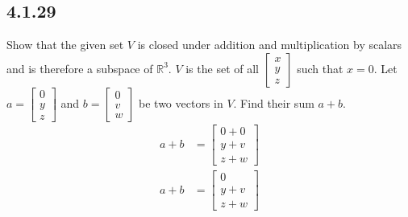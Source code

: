\documentclass{article}
\begin{document}
\subsection{4.1.29}
Show that the given set $ V $ is closed under addition and multiplication by scalars and is therefore a subspace of $ \mathbb{R}^3 $.
$ V $ is the set of all $ \begin{bmatrix} x \\ y \\ z \end{bmatrix} $ such that $ x = 0 $.
Let $ a = \begin{bmatrix} 0 \\ y \\ z \end{bmatrix} $ and $ b = \begin{bmatrix} 0 \\ v \\ w \end{bmatrix} $ be two vectors in $ V $. Find their sum $ a + b $.
\begin{align*}
	a + b & =
		\begin{bmatrix}
			0 + 0 \\
			y + v \\
			z + w
		\end{bmatrix} \\
	a + b & =
		\begin{bmatrix}
			0 \\
			y + v \\
			z + w
		\end{bmatrix}
\end{align*}
\end{document}
